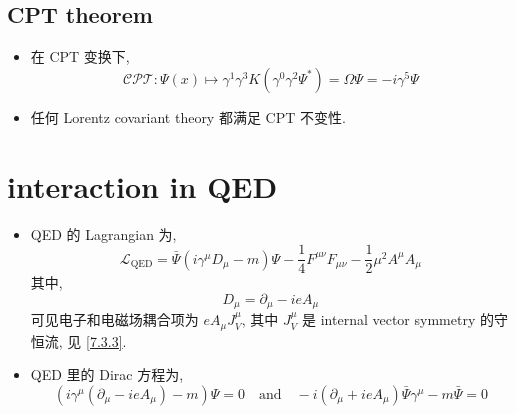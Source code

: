\subsection{CPT theorem}
\begin{itemize}
	\item 在 CPT 变换下,
	\begin{equation}
		\mathcal{CPT} : \Psi(x) \mapsto \gamma^1 \gamma^3 K (\gamma^0 \gamma^2 \Psi^*) = \Omega \Psi = - i \gamma^5 \Psi
	\end{equation}
	
	\item 任何 Lorentz covariant theory 都满足 CPT 不变性.
\end{itemize}

\section{interaction in QED}
\begin{itemize}
	\item QED 的 Lagrangian 为,
	\begin{equation}
		\mathcal{L}_\text{QED} = \bar{\Psi} (i \gamma^\mu D_\mu - m) \Psi - \frac{1}{4} F^{\mu \nu} F_{\mu \nu} - \frac{1}{2} \mu^2 A^\mu A_\mu
	\end{equation}
	其中,
	\begin{equation}
		D_\mu = \partial_\mu - i e A_\mu
	\end{equation}
	可见电子和电磁场耦合项为 $e A_\mu J_V^\mu$, 其中 $J_V^\mu$ 是 internal vector symmetry 的守恒流, 见 \eqref{7.3.3}.
	
	\item QED 里的 Dirac 方程为,
	\begin{equation}
		(i \gamma^\mu (\partial_\mu - i e A_\mu) - m) \Psi = 0 \quad \text{and} \quad - i (\partial_\mu + i e A_\mu) \bar{\Psi} \gamma^\mu - m \bar{\Psi} = 0
	\end{equation}
\end{itemize}

